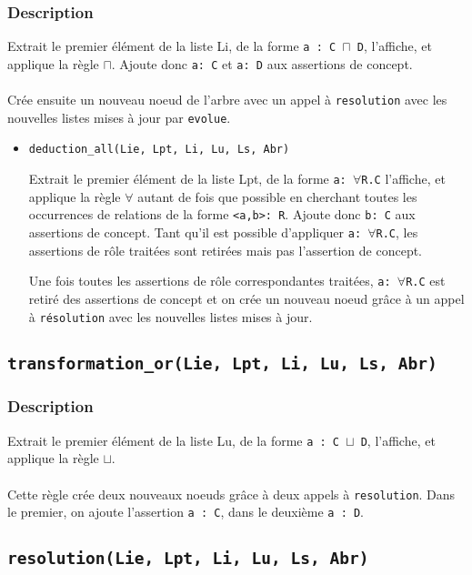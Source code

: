 \documentclass{article}
\newcommand{\code}[1]{\colorbox{light-gray}{\texttt{#1}}}
\begin{document}
\subsubsection{Description}
Extrait le premier élément de la liste Li, de la forme \code{a : C $\sqcap$ D}, l'affiche, et applique la règle $\sqcap$. Ajoute donc \code{a: C} et \code{a: D} aux assertions de concept.
\\\\
Crée ensuite un nouveau noeud de l'arbre avec un appel à \code{resolution} avec les nouvelles listes mises à jour par \code{evolue}.

\begin{itemize}
    \item \code{deduction\_all(Lie, Lpt, Li, Lu, Ls, Abr)}

    Extrait le premier élément de la liste Lpt, de la forme \code{a: $\forall$R.C} l'affiche, et applique la règle $\forall$ autant de fois que possible en cherchant toutes les occurrences de relations de la forme \code{<a,b>: R}. Ajoute donc \code{b: C} aux assertions de concept. Tant qu'il est possible d'appliquer  \code{a: $\forall$R.C}, les assertions de rôle traitées sont retirées mais pas l'assertion de concept.
    
    Une fois toutes les assertions de rôle correspondantes traitées, \code{a: $\forall$R.C} est retiré des assertions de concept et on crée un nouveau noeud grâce à un appel à \code{résolution} avec les nouvelles listes mises à jour.
\end{itemize}

\subsection{\code{transformation\_or(Lie, Lpt, Li, Lu, Ls, Abr)}}

\subsubsection{Description}
Extrait le premier élément de la liste Lu, de la forme \code{a : C $\sqcup$ D}, l'affiche, et applique la règle $\sqcup$.
\\\\
Cette règle crée deux nouveaux noeuds grâce à deux appels à \code{resolution}. Dans le premier, on ajoute l'assertion \code{a : C}, dans le deuxième \code{a : D}.

\subsection{\code{resolution(Lie, Lpt, Li, Lu, Ls, Abr)}}
\end{document}
